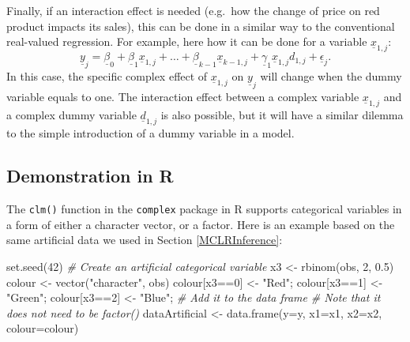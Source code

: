 \documentclass[
]{book}
\newenvironment{Shaded}{\begin{snugshade}}{\end{snugshade}}
\newcommand{\AttributeTok}[1]{\textcolor[rgb]{0.77,0.63,0.00}{#1}}
\newcommand{\CommentTok}[1]{\textcolor[rgb]{0.56,0.35,0.01}{\textit{#1}}}
\newcommand{\DecValTok}[1]{\textcolor[rgb]{0.00,0.00,0.81}{#1}}
\newcommand{\FloatTok}[1]{\textcolor[rgb]{0.00,0.00,0.81}{#1}}
\newcommand{\FunctionTok}[1]{\textcolor[rgb]{0.00,0.00,0.00}{#1}}
\newcommand{\NormalTok}[1]{#1}
\newcommand{\OtherTok}[1]{\textcolor[rgb]{0.56,0.35,0.01}{#1}}
\newcommand{\SpecialCharTok}[1]{\textcolor[rgb]{0.00,0.00,0.00}{#1}}
\newcommand{\StringTok}[1]{\textcolor[rgb]{0.31,0.60,0.02}{#1}}
\begin{document}
Finally, if an interaction effect is needed (e.g.~how the change of price on red product impacts its sales), this can be done in a similar way to the conventional real-valued regression. For example, here how it can be done for a variable \(\underline{x}_{1,j}\):
\begin{equation}
    \underline{y}_j = \underline{\beta}_0 + \underline{\beta}_1 \underline{x}_{1,j} + \dots + \underline{\beta}_{k-1} \underline{x}_{k-1,j} + \underline{\gamma}_1 \underline{x}_{1,j} d_{1,j} + \underline{\epsilon}_j .
    \label{eq:MultipleCLRComplexDummyInteraction}
\end{equation}
In this case, the specific complex effect of \(\underline{x}_{1,j}\) on \(\underline{y}_j\) will change when the dummy variable equals to one. The interaction effect between a complex variable \(\underline{x}_{1,j}\) and a complex dummy variable \(\underline{d}_{1,j}\) is also possible, but it will have a similar dilemma to the simple introduction of a dummy variable in a model.

\hypertarget{demonstration-in-r-2}{%
\subsection{Demonstration in R}\label{demonstration-in-r-2}}

The \texttt{clm()} function in the \texttt{complex} package in R supports categorical variables in a form of either a character vector, or a factor. Here is an example based on the same artificial data we used in Section \ref{MCLRInference}:

\begin{Shaded}
\begin{Highlighting}[]
\FunctionTok{set.seed}\NormalTok{(}\DecValTok{42}\NormalTok{)}
\CommentTok{\# Create an artificial categorical variable}
\NormalTok{x3 }\OtherTok{\textless{}{-}} \FunctionTok{rbinom}\NormalTok{(obs, }\DecValTok{2}\NormalTok{, }\FloatTok{0.5}\NormalTok{)}
\NormalTok{colour }\OtherTok{\textless{}{-}} \FunctionTok{vector}\NormalTok{(}\StringTok{"character"}\NormalTok{, obs)}
\NormalTok{colour[x3}\SpecialCharTok{==}\DecValTok{0}\NormalTok{] }\OtherTok{\textless{}{-}} \StringTok{"Red"}\NormalTok{;}
\NormalTok{colour[x3}\SpecialCharTok{==}\DecValTok{1}\NormalTok{] }\OtherTok{\textless{}{-}} \StringTok{"Green"}\NormalTok{;}
\NormalTok{colour[x3}\SpecialCharTok{==}\DecValTok{2}\NormalTok{] }\OtherTok{\textless{}{-}} \StringTok{"Blue"}\NormalTok{;}
\CommentTok{\# Add it to the data frame}
\CommentTok{\# Note that it does not need to be factor()}
\NormalTok{dataArtificial }\OtherTok{\textless{}{-}} \FunctionTok{data.frame}\NormalTok{(}\AttributeTok{y=}\NormalTok{y, }\AttributeTok{x1=}\NormalTok{x1, }\AttributeTok{x2=}\NormalTok{x2, }\AttributeTok{colour=}\NormalTok{colour)}
\end{Highlighting}
\end{Shaded}
\end{document}
